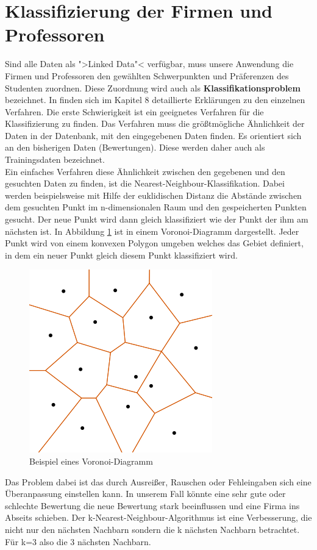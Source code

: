\section{Klassifizierung der Firmen und Professoren}		%
\label{klassifizierung}
Sind alle Daten als ">Linked Data"< verfügbar, muss unsere Anwendung die Firmen und Professoren den gewählten Schwerpunkten und Präferenzen des Studenten zuordnen. Diese Zuordnung wird auch als \textbf{Klassifikationsproblem} bezeichnet. In \cite{Ertel08} finden sich im Kapitel 8 detaillierte Erklärungen zu den einzelnen Verfahren. 
Die erste Schwierigkeit ist ein geeignetes Verfahren für die Klassifizierung zu finden. Das Verfahren muss die größtmögliche Ähnlichkeit der Daten in der Datenbank, mit den eingegebenen Daten finden. Es orientiert sich an den bisherigen Daten (Bewertungen). Diese werden daher auch als Trainingsdaten bezeichnet.
\\
Ein einfaches Verfahren diese Ähnlichkeit zwischen den gegebenen und den gesuchten Daten zu finden, ist die Nearest-Neighbour-Klassifikation. Dabei werden beispielsweise mit Hilfe der euklidischen Distanz die Abstände zwischen dem gesuchten Punkt im n-dimensionalen Raum und den gespeicherten Punkten gesucht. Der neue Punkt wird dann gleich klassifiziert wie der Punkt der ihm am nächsten ist. In Abbildung \ref{graph-voronoi} ist in einem Voronoi-Diagramm dargestellt. Jeder Punkt wird von einem konvexen Polygon umgeben welches das Gebiet definiert, in dem ein neuer Punkt gleich diesem Punkt klassifiziert wird.
\begin{figure}[htbp]
	\centering
	\includegraphics[keepaspectratio,scale=0.6]{images/Voronoi-Diagramm}
	\caption{Beispiel eines Voronoi-Diagramm}
	\label{graph-voronoi}
\end{figure}
\newpage
Das Problem dabei ist das durch Ausreißer, Rauschen oder Fehleingaben sich eine Überanpassung einstellen kann. In unserem Fall könnte eine sehr gute oder schlechte Bewertung die neue Bewertung stark beeinflussen und eine Firma ins Abseits schieben. Der k-Nearest-Neighbour-Algorithmus ist eine Verbesserung, die nicht nur den nächsten Nachbarn sondern die k nächsten Nachbarn betrachtet. Für k=3 also die 3 nächsten Nachbarn.

